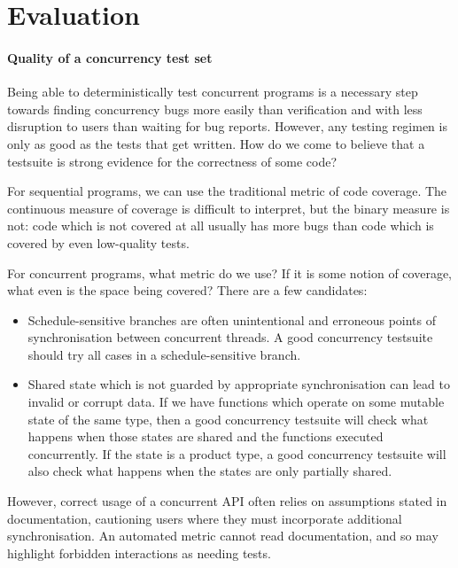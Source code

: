 \blindtext

\section{Evaluation}
\label{sec:conclusions-evaluation}

\paragraph{Quality of a concurrency test set}
Being able to deterministically test concurrent programs is a
necessary step towards finding concurrency bugs more easily than
verification and with less disruption to users than waiting for bug
reports.  However, any testing regimen is only as good as the tests
that get written.  How do we come to believe that a testsuite is
strong evidence for the correctness of some code?

For sequential programs, we can use the traditional metric of code
coverage.  The continuous measure of coverage is difficult to
interpret, but the binary measure is not: code which is not covered at
all usually has more bugs than code which is covered by even
low-quality tests\cite{ahmed2016}.

For concurrent programs, what metric do we use?  If it is some notion
of coverage, what even is the space being covered?  There are a few
candidates:

\begin{itemize}
\item Schedule-sensitive branches are often unintentional and
  erroneous points of synchronisation between concurrent
  threads\cite{huang2015ssb}.  A good concurrency testsuite should try
  all cases in a schedule-sensitive branch.

\item Shared state which is not guarded by appropriate synchronisation
  can lead to invalid or corrupt data.  If we have functions which
  operate on some mutable state of the same type, then a good
  concurrency testsuite will check what happens when those states are
  shared and the functions executed concurrently.  If the state is a
  product type, a good concurrency testsuite will also check what
  happens when the states are only partially shared.
\end{itemize}

However, correct usage of a concurrent API often relies on assumptions
stated in documentation, cautioning users where they must incorporate
additional synchronisation.  An automated metric cannot read
documentation, and so may highlight forbidden interactions as needing
tests.

